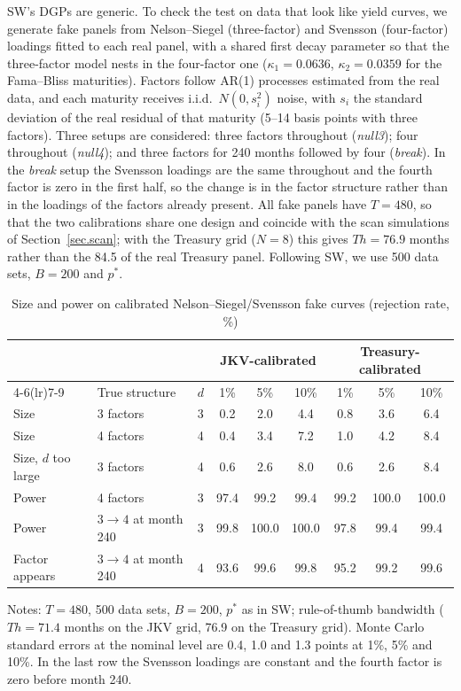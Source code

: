 \documentclass[11pt]{article}
\begin{document}
SW's DGPs are generic. To check the test on data that look like yield curves, we generate fake panels from Nelson--Siegel (three-factor) and Svensson (four-factor) loadings fitted to each real panel, with a shared first decay parameter so that the three-factor model nests in the four-factor one ($\kappa_1=0.0636$, $\kappa_2=0.0359$ for the Fama--Bliss maturities). Factors follow AR(1) processes estimated from the real data, and each maturity receives i.i.d.\ $N(0,s_i^2)$ noise, with $s_i$ the standard deviation of the real residual of that maturity (5--14 basis points with three factors). Three setups are considered: three factors throughout (\emph{null3}); four throughout (\emph{null4}); and three factors for 240 months followed by four (\emph{break}). In the \emph{break} setup the Svensson loadings are the same throughout and the fourth factor is zero in the first half, so the change is in the factor structure rather than in the loadings of the factors already present. All fake panels have $T=480$, so that the two calibrations share one design and coincide with the scan simulations of Section~\ref{sec.scan}; with the Treasury grid ($N=8$) this gives $Th=76.9$ months rather than the 84.5 of the real Treasury panel. Following SW, we use 500 data sets, $B=200$ and $p^*$.

\begin{table}[htbp]
\centering
\begin{threeparttable}
\caption{Size and power on calibrated Nelson--Siegel/Svensson fake curves (rejection rate, \%)}\label{tab.fakesize}
\begin{tabular}{lllcccccc}
\toprule
 & & & \multicolumn{3}{c}{JKV-calibrated} & \multicolumn{3}{c}{Treasury-calibrated}\\
\cmidrule(lr){4-6}\cmidrule(lr){7-9}
 & True structure & $d$ & 1\% & 5\% & 10\% & 1\% & 5\% & 10\%\\
\midrule
Size & 3 factors & 3 & 0.2 & 2.0 & 4.4 & 0.8 & 3.6 & 6.4\\
Size & 4 factors & 4 & 0.4 & 3.4 & 7.2 & 1.0 & 4.2 & 8.4\\
Size, $d$ too large & 3 factors & 4 & 0.6 & 2.6 & 8.0 & 0.6 & 2.6 & 8.4\\[3pt]
Power & 4 factors & 3 & 97.4 & 99.2 & 99.4 & 99.2 & 100.0 & 100.0\\
Power & $3\to4$ at month 240 & 3 & 99.8 & 100.0 & 100.0 & 97.8 & 99.4 & 99.4\\
Factor appears & $3\to4$ at month 240 & 4 & 93.6 & 99.6 & 99.8 & 95.2 & 99.2 & 99.6\\
\bottomrule
\end{tabular}
\begin{tablenotes}\small
\item Notes: $T=480$, 500 data sets, $B=200$, $p^*$ as in SW; rule-of-thumb bandwidth ($Th=71.4$ months on the JKV grid, 76.9 on the Treasury grid). Monte Carlo standard errors at the nominal level are 0.4, 1.0 and 1.3 points at 1\%, 5\% and 10\%. In the last row the Svensson loadings are constant and the fourth factor is zero before month 240.
\end{tablenotes}
\end{threeparttable}
\end{table}
\end{document}
